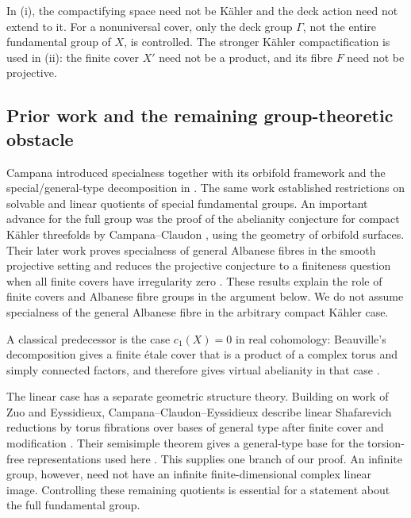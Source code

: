 In (i), the compactifying space need not be K\"ahler and the deck action
need not extend to it. For a nonuniversal cover, only the deck group
\(\Gamma\), not the entire fundamental group of \(X\), is controlled.
The stronger K\"ahler compactification is used in (ii): the finite
cover \(X'\) need not be a product, and its fibre \(F\) need not be
projective.

\subsection{Prior work and the remaining group-theoretic obstacle}

Campana introduced specialness together with its orbifold framework
and the special/general-type decomposition in \cite{Campana2004}.
The same work established restrictions on solvable and linear
quotients of special fundamental groups. An important advance for the
full group was the proof of the abelianity conjecture for compact
K\"ahler threefolds by Campana--Claudon
\cite[Theorem~1.1]{CampanaClaudonThreefolds}, using the geometry of
orbifold surfaces. Their later work proves specialness of general
Albanese fibres in the smooth projective setting and reduces the
projective conjecture to a finiteness question when all finite covers
have irregularity zero
\cite[author's version, Theorem~2.4 and Proposition~3.2]{CampanaClaudon}.
These results explain the role of finite covers and Albanese fibre
groups in the argument below. We do not assume specialness of the
general Albanese fibre in the arbitrary compact K\"ahler case.

A classical predecessor is the case \(c_1(X)=0\) in real cohomology:
Beauville's decomposition gives a finite \'etale cover that is a
product of a complex torus and simply connected factors, and therefore
gives virtual abelianity in that case
\cite[Section~5, Theorem~2]{Beauville1983}.

The linear case has a separate geometric structure theory.
Building on work of Zuo and Eyssidieux, Campana--Claudon--Eyssidieux
describe linear Shafarevich reductions
by torus fibrations over bases of general type after finite cover and
modification \cite[author's version, Theorem~6.5]{CCE2015}.
Their semisimple theorem gives a general-type base for the torsion-free
representations used here
\cite[author's version, Theorems~1 and~6.3]{CCE2015}.
This supplies one branch of our proof. An infinite group, however,
need not have an infinite finite-dimensional complex linear image.
Controlling these remaining quotients is essential for a statement
about the full fundamental group.

